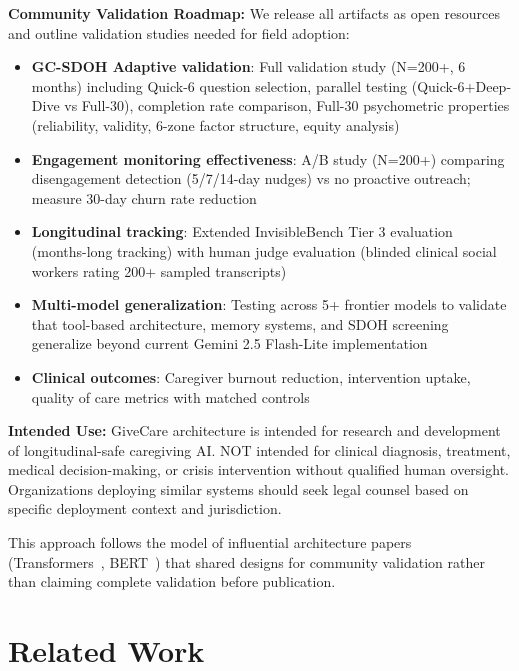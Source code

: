 \documentclass{article}
\begin{document}
\textbf{Community Validation Roadmap:} We release all artifacts as open resources and outline validation studies needed for field adoption:

\begin{itemize}
    \item \textbf{GC-SDOH Adaptive validation}: Full validation study (N=200+, 6 months) including Quick-6 question selection, parallel testing (Quick-6+Deep-Dive vs Full-30), completion rate comparison, Full-30 psychometric properties (reliability, validity, 6-zone factor structure, equity analysis)
    \item \textbf{Engagement monitoring effectiveness}: A/B study (N=200+) comparing disengagement detection (5/7/14-day nudges) vs no proactive outreach; measure 30-day churn rate reduction
    \item \textbf{Longitudinal tracking}: Extended InvisibleBench Tier 3 evaluation (months-long tracking) with human judge evaluation (blinded clinical social workers rating 200+ sampled transcripts)
    \item \textbf{Multi-model generalization}: Testing across 5+ frontier models to validate that tool-based architecture, memory systems, and SDOH screening generalize beyond current Gemini 2.5 Flash-Lite implementation
    \item \textbf{Clinical outcomes}: Caregiver burnout reduction, intervention uptake, quality of care metrics with matched controls
\end{itemize}

\textbf{Intended Use:} GiveCare architecture is intended for research and development of longitudinal-safe caregiving AI. NOT intended for clinical diagnosis, treatment, medical decision-making, or crisis intervention without qualified human oversight. Organizations deploying similar systems should seek legal counsel based on specific deployment context and jurisdiction.

This approach follows the model of influential architecture papers (Transformers~\cite{vaswani2017}, BERT~\cite{devlin2018bert}) that shared designs for community validation rather than claiming complete validation before publication.

%
\section{Related Work}%
\label{sec:RelatedWork}%
%
\end{document}
